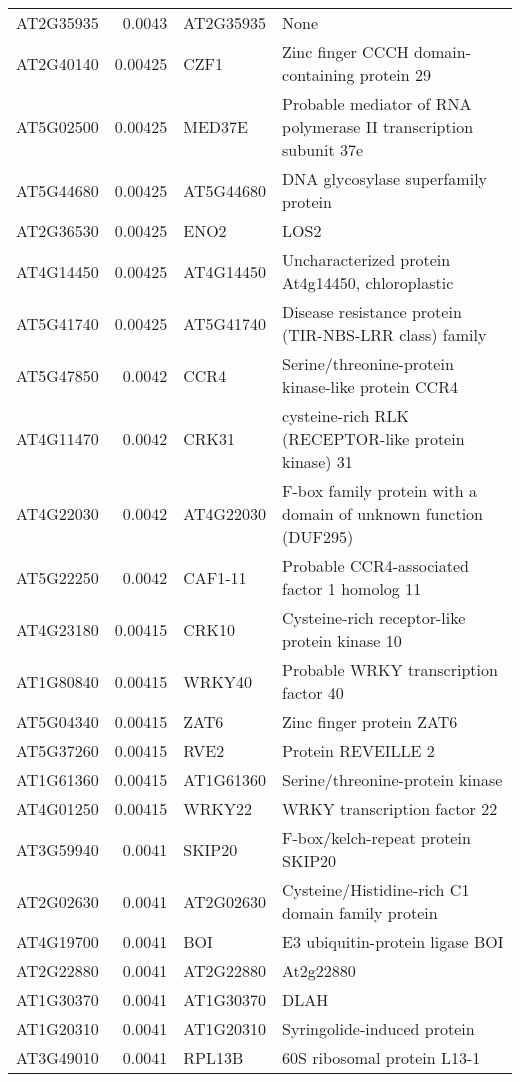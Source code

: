\documentclass[a4paper]{article}
\begin{document}
\begin{center}
\begin{tabular}{lrll}
AT2G35935 & 0.0043 & AT2G35935 & None\\
AT2G40140 & 0.00425 & CZF1 & Zinc finger CCCH domain-containing protein 29\\
AT5G02500 & 0.00425 & MED37E & Probable mediator of RNA polymerase II transcription subunit 37e\\
AT5G44680 & 0.00425 & AT5G44680 & DNA glycosylase superfamily protein\\
AT2G36530 & 0.00425 & ENO2 & LOS2\\
AT4G14450 & 0.00425 & AT4G14450 & Uncharacterized protein At4g14450, chloroplastic\\
AT5G41740 & 0.00425 & AT5G41740 & Disease resistance protein (TIR-NBS-LRR class) family\\
AT5G47850 & 0.0042 & CCR4 & Serine/threonine-protein kinase-like protein CCR4\\
AT4G11470 & 0.0042 & CRK31 & cysteine-rich RLK (RECEPTOR-like protein kinase) 31\\
AT4G22030 & 0.0042 & AT4G22030 & F-box family protein with a domain of unknown function (DUF295)\\
AT5G22250 & 0.0042 & CAF1-11 & Probable CCR4-associated factor 1 homolog 11\\
AT4G23180 & 0.00415 & CRK10 & Cysteine-rich receptor-like protein kinase 10\\
AT1G80840 & 0.00415 & WRKY40 & Probable WRKY transcription factor 40\\
AT5G04340 & 0.00415 & ZAT6 & Zinc finger protein ZAT6\\
AT5G37260 & 0.00415 & RVE2 & Protein REVEILLE 2\\
AT1G61360 & 0.00415 & AT1G61360 & Serine/threonine-protein kinase\\
AT4G01250 & 0.00415 & WRKY22 & WRKY transcription factor 22\\
AT3G59940 & 0.0041 & SKIP20 & F-box/kelch-repeat protein SKIP20\\
AT2G02630 & 0.0041 & AT2G02630 & Cysteine/Histidine-rich C1 domain family protein\\
AT4G19700 & 0.0041 & BOI & E3 ubiquitin-protein ligase BOI\\
AT2G22880 & 0.0041 & AT2G22880 & At2g22880\\
AT1G30370 & 0.0041 & AT1G30370 & DLAH\\
AT1G20310 & 0.0041 & AT1G20310 & Syringolide-induced protein\\
AT3G49010 & 0.0041 & RPL13B & 60S ribosomal protein L13-1\\

\end{tabular}
\end{center}
\end{document}
